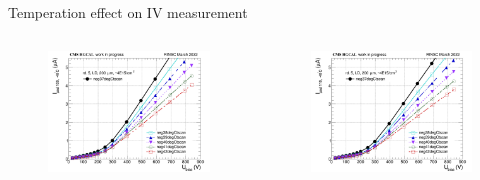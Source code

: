 \documentclass{beamer}
\begin{document}
\begin{frame}{Temperation effect on IV measurement}
    \begin{columns}
        \begin{figure}
            \includegraphics[width=1.0\textwidth]{plots/8in_198ch_2019_N4790_21_4E15_tempareture_effect_100.png}
        \end{figure}
        \begin{figure}
            \includegraphics[width=1.0\textwidth]{plots/8in_198ch_2019_N4790_21_4E15_tempareture_effect_110.png}
        \end{figure}
    \end{columns}
\end{frame}
\end{document}
